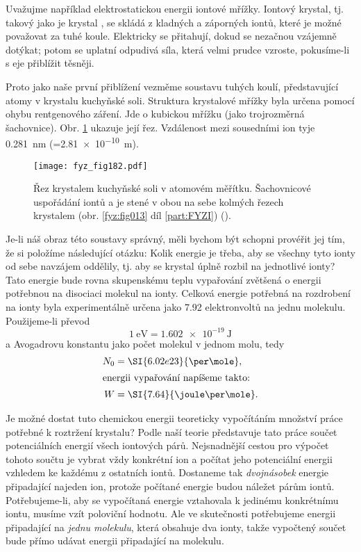     Uvažujme například elektrostatickou energii iontové mřížky. Iontový krystal, tj. takový jako je
    krystal , se skládá z kladných a záporných iontů, které je možné považovat za tuhé
    koule. Elektricky se přitahují, dokud se nezačnou vzájemně dotýkat; potom se uplatní odpudivá
    síla, která velmi prudce vzroste, pokusíme-li s eje přiblížit těsněji.
    
    Proto jako naše první přiblížení vezměme soustavu tuhých koulí, představující atomy v krystalu
    kuchyňské soli. Struktura krystalové mřížky byla určena pomocí ohybu rentgenového záření. Jde o
    kubickou mřížku (jako trojrozměrná šachovnice). Obr. \ref{fyz:fig182} ukazuje její řez.
    Vzdálenost mezi sousedními ion tyje \SI{0.281}{\nm} (=\SI{2.81e-10}{\m}).
    
    \begin{figure}[ht!]  %
      \centering
      \texttt{[image: fyz\_fig182.pdf]}
      \caption{Řez krystalem kuchyňské soli v atomovém měřítku. Šachovnicové uspořádání iontů  
              a  je stené v obou na sebe kolmých řezech krystalem (obr. \ref{fyz:fig013} díl
              \ref{part:FYZI}) (\cite[s.~146]{Feynman02}).}
      \label{fyz:fig182}
    \end{figure}

    Je-li náš obraz této soustavy správný, měli bychom být schopni provéřit jej tím, že si položíme
    následující otázku: Kolik energie je třeba, aby se všechny tyto ionty od sebe navzájem oddělily,
    tj. aby se krystal úplně rozbil na jednotlivé ionty? Tato energie bude rovna skupenskému teplu
    vypařování  zvětšená o energii potřebnou na disociaci molekul na ionty. Celková energie
    potřebná na rozdrobení  na ionty byla experimentálně určena jako \num{7.92}
    elektronvoltů na jednu molekulu. Použijeme-li převod
    \begin{equation*}
      \SI{1}{\electronvolt} = \SI{1.602e-19}{\joule}
    \end{equation*}
    a Avogadrovu konstantu jako počet molekul v jednom molu, tedy
    \begin{align*}
      N_0 &= \SI{6.02e23}{\per\mole},  \\
      \shortintertext{energii vypařování napíšeme takto:}
      W   &= \SI{7.64}{\joule\per\mole}.
    \end{align*}

    Je možné dostat tuto chemickou energii teoreticky vypočítáním množství práce potřebné k
    roztržení krystalu? Podle naší teorie představuje tato práce součet potenciálních energií všech
    iontových párů. Nejsnadnější cestou pro výpočet tohoto součtu je vybrat vždy konkrétní ion a
    počítat jeho potenciální energii vzhledem ke každému z ostatních iontů. Dostaneme tak
    \emph{dvojnásobek} energie připadající najeden ion, protože počítané energie budou náležet párům
    iontů. Potřebujeme-li, aby se vypočítaná energie vztahovala k jedinému konkrétnímu iontu, musíme
    vzít poloviční hodnotu. Ale ve skutečnosti potřebujeme energii připadající na \emph{jednu
    molekulu}, která obsahuje dva ionty, takže vypočtený součet bude přímo udávat energii
    připadající na molekulu.

